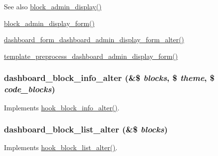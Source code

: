 \begin{DoxySeeAlso}{See also}
\hyperlink{block_8admin_8inc_a46d186397b98e4faf46681f7f9cd86a1}{block\_\-admin\_\-display()} 

\hyperlink{group__forms_ga19dc9d98e83e7e7c9574298100752ba7}{block\_\-admin\_\-display\_\-form()} 

\hyperlink{dashboard_8module_a51045bc5f407b9e76a6dfb9b182bad12}{dashboard\_\-form\_\-dashboard\_\-admin\_\-display\_\-form\_\-alter()} 

\hyperlink{dashboard_8module_addaee36bd5501ed3c8fbefa12a866f22}{template\_\-preprocess\_\-dashboard\_\-admin\_\-display\_\-form()} 
\end{DoxySeeAlso}
\hypertarget{dashboard_8module_a3078195deddafd6b6054bf7f3928207a}{
\subsubsection[{dashboard\_\-block\_\-info\_\-alter}]{\setlength{\rightskip}{0pt plus 5cm}dashboard\_\-block\_\-info\_\-alter (\&\$ {\em blocks}, \/  \$ {\em theme}, \/  \$ {\em code\_\-blocks})}}
\label{dashboard_8module_a3078195deddafd6b6054bf7f3928207a}
Implements \hyperlink{group__hooks_ga6a57bda0a2640ccadef4d7c8b6d2a26f}{hook\_\-block\_\-info\_\-alter()}. \hypertarget{dashboard_8module_a8eb99c8e9edd83aab44177f65e1c78b1}{
\subsubsection[{dashboard\_\-block\_\-list\_\-alter}]{\setlength{\rightskip}{0pt plus 5cm}dashboard\_\-block\_\-list\_\-alter (\&\$ {\em blocks})}}
\label{dashboard_8module_a8eb99c8e9edd83aab44177f65e1c78b1}
Implements \hyperlink{group__hooks_gaf38c7633b52b18831e3ec0459d8e9f41}{hook\_\-block\_\-list\_\-alter()}.

